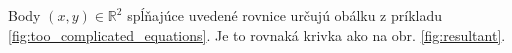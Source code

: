 Body $(x,y)\in \mathbb{R}^2$ spĺňajúce uvedené rovnice určujú obálku z príkladu \ref{fig:too_complicated_equations}. Je to rovnaká krivka ako na obr. \ref{fig:resultant}.


 